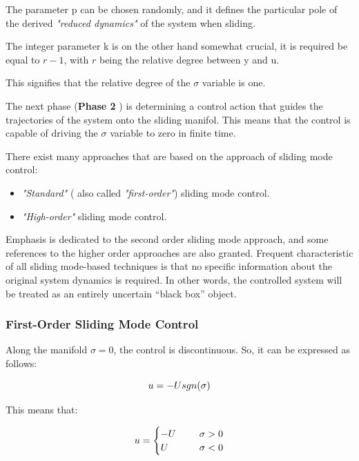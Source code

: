 \documentclass{thesisreport}
\begin{document}
\noindent The parameter p can be chosen randomly, and it defines the particular pole of the derived \textit{"reduced dynamics"} of the system when sliding.
 

\noindent The integer parameter k is on the other hand somewhat crucial, it is required be equal to $r-1$, with $r$ being the relative
degree between y and u.


\noindent This signifies that the relative degree of the $\sigma$ variable is one.


\noindent The next phase (\textbf{Phase 2 }) is determining a control action that guides the trajectories of the system onto the sliding manifol. This means that the control is capable of driving the $\sigma$ variable to zero in finite time.


\noindent There exist many approaches that are based on the approach of sliding mode control:

\begin{itemize}
	\item \textit{"Standard"} ( also called \textit{"first-order"}) sliding mode control.
	\item \textit{"High-order"} sliding mode control.
\end{itemize}


Emphasis is dedicated to the second order sliding mode approach, and some references to the higher order approaches
are also granted. Frequent characteristic of all sliding mode-based techniques is that no specific information about the
original system dynamics is required. In other words, the controlled system will be treated as an entirely uncertain “black box” object.



\subsubsection{First-Order Sliding Mode Control}


Along the manifold $\sigma=0$, the control is discontinuous. So, it can be expressed as follows:

\begin{equation}
	u = -U \space sgn(\sigma)
\end{equation}


This means that:

\begin{equation}
\begin{aligned}
	u = \begin{cases}
		-U \hspace{0.5cm} &\sigma>0 \\
		U \hspace{0.5cm}  &\sigma<0
	\end{cases}
\end{aligned}
\end{equation}
\end{document}
